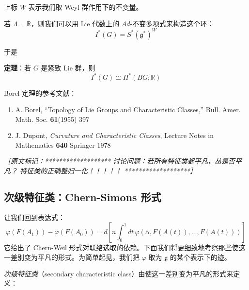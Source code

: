 上标 $W$ 表示我们取 Weyl 群作用下的不变量。

若 $\Lambda=\mathbb{R}$，则我们可以用 Lie 代数上的 $Ad$-不变多项式来构造这个环：
\begin{equation}
  I^*(G) = S^*(\mathfrak{g}^*)^W
  \tag{I.26}
  \label{eq:I.26}
\end{equation}

于是

\textbf{定理}：若 $G$ 是紧致 Lie 群，则
\begin{equation}
  I^*(G)\cong H^*(BG;\mathbb{R})
  \tag{I.27}
  \label{eq:I.27}
\end{equation}

Borel 定理的参考文献：

\begin{enumerate}
  \item A. Borel, ``Topology of Lie Groups and Characteristic Classes,'' Bull. Amer. Math. Soc. \textbf{61}(1955) 397
  \item J. Dupont, \emph{Curvature and Characteristic Classes}, Lecture Notes in Mathematics \textbf{640} Springer 1978
\end{enumerate}

{\small\itshape ［原文标记：*******************\newline
讨论问题：若所有特征类都平凡，丛是否平凡？\newline
特征类的正确整归一化！！！！！\newline
*******************］}

\subsection{次级特征类：Chern-Simons 形式} %

让我们回到表达式：
\begin{equation}
  \varphi(F(A_1))-\varphi(F(A_0))
  = d\left[n\int_0^1 dt\,\varphi(\alpha,F(A(t)),\dots,F(A(t)))\right]
  \tag{I.28}
  \label{eq:I.28}
\end{equation}
它给出了 Chern-Weil 形式对联络选取的依赖。下面我们将更细致地考察那些使这一差别变为平凡的形式。为简单起见，我们把 $\varphi$ 取为 $\mathfrak{g}$ 的某个表示下的迹。

\emph{次级特征类}（secondary characteristic class）由使这一差别变为平凡的形式来定义：

